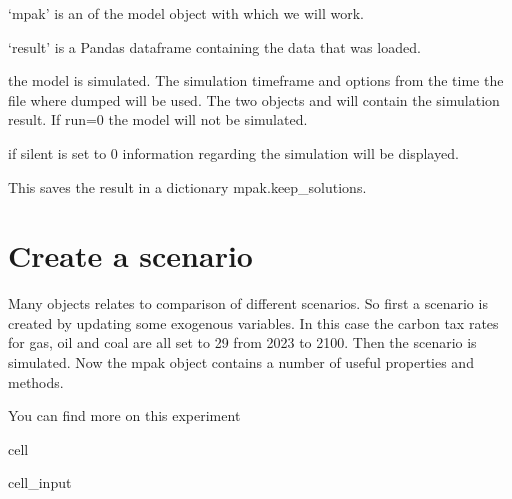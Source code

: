 \documentclass[letterpaper,10pt,english]{jupyterBook}
\begin{document}
\sphinxAtStartPar
‘mpak’ is an   of the  model object with which we will work.

\sphinxAtStartPar
{}  
‘result’ is a Pandas dataframe containing the data that was loaded.

\sphinxAtStartPar
{} the model is simulated. The simulation timeframe  and options from the time the file where dumped will be used. The two objects  and  will contain the simulation result. If run=0 the model will not be simulated.

\sphinxAtStartPar
{} if silent is set to 0  information regarding the simulation will be displayed.

\sphinxAtStartPar
{} This saves the result in a dictionary mpak.keep\_solutions.


\section{Create a scenario}
\label{\detokenize{content/Python/modelflow_features:create-a-scenario}}
\sphinxAtStartPar
Many objects relates to comparison of different scenarios. So first a scenario is created by updating some exogenous variables.
In this case the carbon tax rates for gas, oil and coal are all set to 29 from 2023 to 2100. Then the scenario is simulated.
Now the mpak object contains a number of useful properties and methods.

\sphinxAtStartPar
You can find more on this experiment {\hyperref[\detokenize{content/howto/experiments/create_experiment::doc}]{}}

\begin{sphinxuseclass}{cell}\begin{sphinxVerbatimInput}

\begin{sphinxuseclass}{cell_input}
\begin{sphinxVerbatim}[commandchars=\\\{\}]
    
\end{sphinxVerbatim}

\end{sphinxuseclass}\end{sphinxVerbatimInput}

\end{sphinxuseclass}
\end{document}
